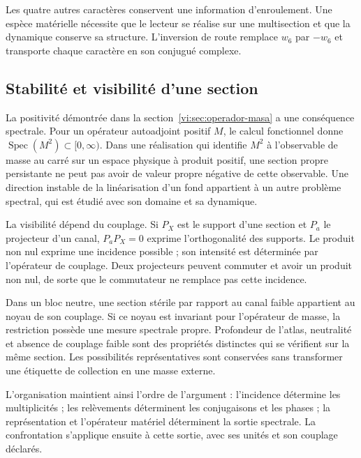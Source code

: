 Les quatre autres caractères conservent une information d’enroulement.
Une espèce matérielle nécessite que le lecteur se réalise sur une
multisection et que la dynamique conserve sa structure. L’inversion
de route remplace $w_6$ par $-w_6$ et transporte chaque caractère en son
conjugué complexe.

\subsection{Stabilité et visibilité d’une section}

La positivité démontrée dans la
section~\ref{vi:sec:operador-masa} a une conséquence spectrale.
Pour un opérateur autoadjoint positif $M$, le calcul fonctionnel donne
$\operatorname{Spec}(M^2)\subset[0,\infty)$. Dans une réalisation qui
identifie $M^2$ à l’observable de masse au carré sur un
espace physique à produit positif, une section propre persistante
ne peut pas avoir de valeur propre négative de cette observable. Une direction
instable de la linéarisation d’un fond appartient à un autre problème
spectral, qui est étudié avec son domaine et sa dynamique.

La visibilité dépend du couplage. Si $P_X$ est le support d’une
section et $P_a$ le projecteur d’un canal, $P_aP_X=0$ exprime
l’orthogonalité des supports. Le produit non nul exprime une incidence
possible ; son intensité est déterminée par l’opérateur de couplage.
Deux projecteurs peuvent commuter et avoir un produit non nul, de sorte
que le commutateur ne remplace pas cette incidence.

Dans un bloc neutre, une section stérile par rapport au canal faible
appartient au noyau de son couplage. Si ce noyau est invariant
pour l’opérateur de masse, la restriction possède une mesure spectrale
propre. Profondeur de l’atlas, neutralité et absence de couplage
faible sont des propriétés distinctes qui se vérifient sur la même
section. Les possibilités représentatives sont conservées sans
transformer une étiquette de collection en une masse externe.

L’organisation maintient ainsi l’ordre de l’argument : l’incidence
détermine les multiplicités ; les relèvements déterminent
les conjugaisons et les phases ; la représentation et l’opérateur matériel
déterminent la sortie spectrale. La confrontation s’applique ensuite à
cette sortie, avec ses unités et son couplage déclarés.
